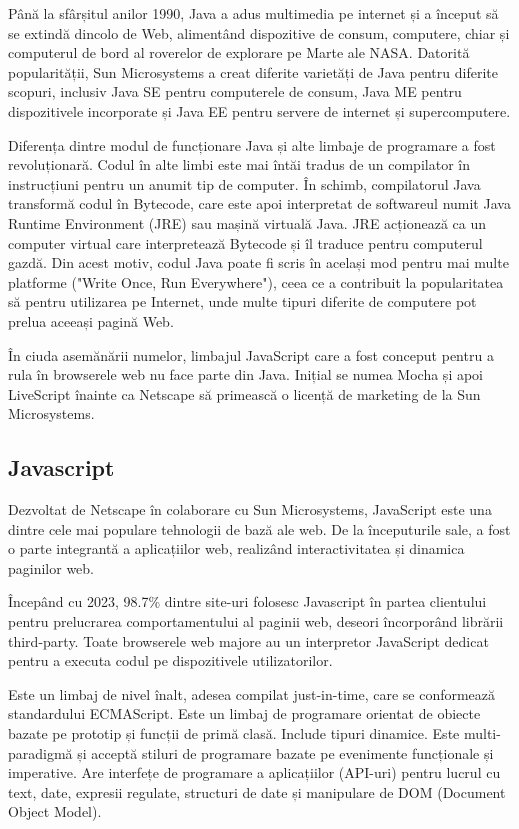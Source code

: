 \documentclass[a4paper,12pt]{article}
\begin{document}
    Până la sfârșitul anilor 1990, Java a adus multimedia pe internet și a început să se extindă
    dincolo de Web, alimentând dispozitive de consum, computere, chiar și computerul de bord al
    roverelor de explorare pe Marte ale NASA. Datorită popularității, Sun Microsystems a creat diferite
    varietăți de Java pentru diferite scopuri, inclusiv Java SE pentru computerele de consum, Java ME pentru 
    dispozitivele incorporate și Java EE pentru servere de internet și supercomputere.

    Diferența dintre modul de funcționare Java și alte limbaje de programare a fost 
    revoluționară. Codul în alte limbi este mai întăi tradus de un compilator în instrucțiuni pentru un anumit tip de computer. În schimb,
    compilatorul Java transformă codul în Bytecode, care este apoi interpretat de softwareul numit Java Runtime Environment
    (JRE) sau mașină virtuală Java. JRE acționează ca un computer virtual care interpretează Bytecode și îl traduce pentru
    computerul gazdă. Din acest motiv, codul Java poate fi scris în același mod pentru mai multe platforme 
    ("Write Once, Run Everywhere"), ceea ce a contribuit la popularitatea să pentru utilizarea pe Internet,
    unde multe tipuri diferite de computere pot prelua aceeași pagină Web.
    
    În ciuda asemănării numelor, limbajul JavaScript care a fost conceput pentru a rula în browserele web nu face parte din Java.
    Inițial se numea Mocha și apoi LiveScript înainte ca Netscape să primească o licență de marketing de la Sun Microsystems.
    \subsection{Javascript}
    Dezvoltat de Netscape în colaborare cu Sun Microsystems, JavaScript este una dintre cele mai populare tehnologii de bază ale web. De la
    începuturile sale, a fost o parte integrantă a aplicațiilor web, realizând interactivitatea și dinamica paginilor web.

    Începând cu 2023, 98.7\% dintre site-uri folosesc Javascript în partea clientului pentru prelucrarea comportamentului
    al paginii web, deseori încorporând librării third-party. Toate browserele web majore au un interpretor JavaScript dedicat pentru a executa
    codul pe dispozitivele utilizatorilor.
    
    Este un limbaj de nivel înalt, adesea compilat just-in-time, care se conformează standardului ECMAScript. Este un limbaj de programare orientat de obiecte
    bazate pe prototip și funcții de primă clasă. Include tipuri dinamice. Este multi-paradigmă și acceptă stiluri de programare bazate pe
    evenimente funcționale și imperative. Are interfețe de programare a aplicațiilor (API-uri) pentru lucrul cu text, date, expresii regulate, 
    structuri de date și manipulare de DOM (Document Object Model).
\end{document}
